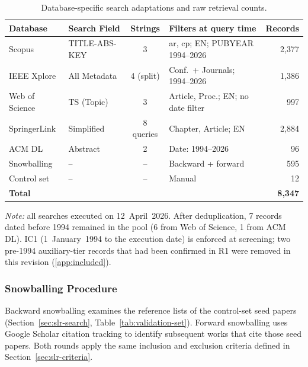 \begin{table}[htbp]
\centering
\caption{Database-specific search adaptations and raw retrieval counts.}
\label{tab:db-adaptations}
\small
\setlength{\tabcolsep}{4pt}
\begin{tabular}{p{2.6cm} p{2.6cm} c p{5.0cm} r}
\toprule
\textbf{Database} & \textbf{Search Field} & \textbf{Strings} & \textbf{Filters at query time} & \textbf{Records} \\
\midrule
Scopus         & TITLE-ABS-KEY & 3         & ar, cp; EN; PUBYEAR 1994--2026          & 2{,}377 \\
IEEE Xplore    & All Metadata  & 4 (split) & Conf.\ + Journals; 1994--2026          & 1{,}386 \\
Web of Science & TS (Topic)    & 3         & Article, Proc.; EN; no date filter     & 997 \\
SpringerLink   & Simplified    & 8 queries & Chapter, Article; EN                   & 2{,}884 \\
ACM DL         & Abstract      & 2         & Date: 1994--2026                       & 96 \\
Snowballing    & --            & --        & Backward + forward                     & 595 \\
Control set    & --            & --        & Manual                                 & 12 \\
\midrule
\textbf{Total} &  &  &  & \textbf{8{,}347} \\
\bottomrule
\end{tabular}

\smallskip
\footnotesize\textit{Note:} all searches executed on 12~April~2026. After
deduplication, 7 records dated before 1994 remained in the pool (6 from Web of
Science, 1 from ACM DL). IC1 (1~January~1994 to the execution date) is
enforced at screening; two pre-1994 auxiliary-tier records that had been
confirmed in R1 were removed in this revision (\ref{app:included}).
\end{table}

\subsubsection{Snowballing Procedure}

Backward snowballing examines the reference lists of the control-set seed
papers (Section~\ref{sec:slr-search}, Table~\ref{tab:validation-set}).
Forward snowballing uses Google Scholar citation tracking to identify
subsequent works that cite those seed papers. Both rounds apply the same
inclusion and exclusion criteria defined in Section~\ref{sec:slr-criteria}.

